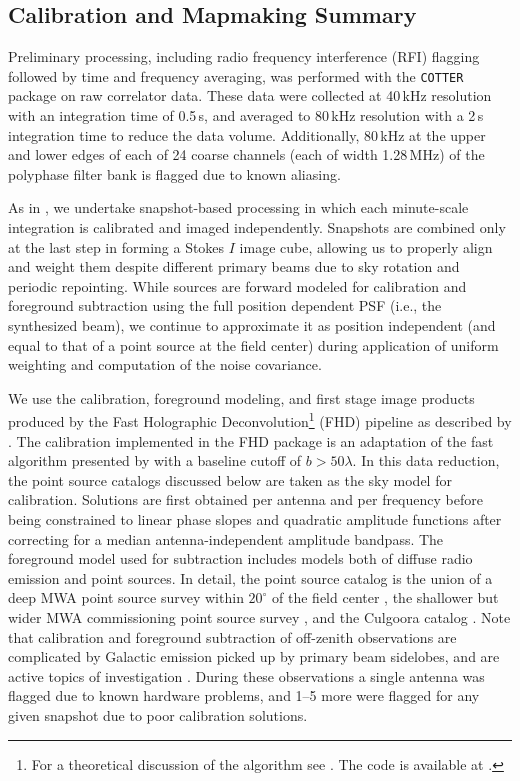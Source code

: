 
\subsection{Calibration and Mapmaking Summary} \label{sec:processing}

Preliminary processing, including radio frequency interference (RFI) flagging followed by time and frequency averaging, was performed with the \texttt{COTTER} package \citep{AndreMWARFI} on raw correlator data. These data were collected at 40\,kHz resolution with an integration time of 0.5\,s, and averaged to 80\,kHz resolution with a 2\,s integration time to reduce the data volume. Additionally, 80\,kHz at the upper and lower edges of each of 24 coarse channels (each of width 1.28\,MHz) of the polyphase filter bank is flagged due to known aliasing.

As in \citet{X13}, we undertake snapshot-based processing in which each minute-scale integration is calibrated and imaged independently. Snapshots are combined only at the last step in forming a Stokes $I$ image cube, allowing us to properly align and weight them despite different primary beams due to sky rotation and periodic repointing. 
While sources are forward modeled for calibration and foreground subtraction using the full position dependent PSF (i.e., the synthesized beam), we continue to approximate it as position independent (and equal to that of a point source at the field center) during application of uniform weighting and computation of the noise covariance. 

We use the calibration, foreground modeling, and first stage image products produced by the Fast Holographic Deconvolution\footnote{For a theoretical discussion of the algorithm see \citet{fhd}. The code is available at .} (FHD) pipeline as described by \citet{JacobsPipelines}. The calibration implemented in the FHD package is an adaptation of the fast algorithm presented by \citet{Salvini2014} with a baseline cutoff of $b>50\lambda$. In this data reduction, the point source catalogs discussed below are taken as the sky model for calibration.  Solutions are first obtained per antenna and per frequency before being constrained to linear phase slopes and quadratic amplitude functions after correcting for a median antenna-independent amplitude bandpass.  The foreground model used for subtraction includes models both of diffuse radio emission \citep{AdamDiffuse} and point sources. In detail, the point source catalog is the union of a deep MWA point source survey within $20^\circ$ of the field center \citep{PattiCatalog1}, the shallower but wider MWA commissioning point source survey \citep{MWACS}, and the Culgoora catalog \citep{Slee1995}. Note that calibration and foreground subtraction of off-zenith observations are complicated by Galactic emission picked up by primary beam sidelobes, and are active topics of investigation \citep{pober16,nithya15,nithya15b}. During these observations a single antenna was flagged due to known hardware problems, and 1--5 more were flagged for any given snapshot due to poor calibration solutions.

